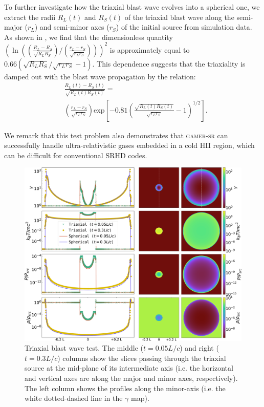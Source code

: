 To further investigate how the triaxial blast wave evolves into a spherical one, we extract the radii $R_{L}(t)$ and $R_{S}(t)$ of the triaxial blast wave along the semi-major ($r_{L}$) and semi-minor axes ($r_{S}$) of the initial source from simulation data. As shown in , we find that the dimensionless quantity $\left(\ln \left(\left(\frac{R_{L}-R_{S}}{\sqrt{R_{L}R_{S}}}\right)/ \left(\frac{r_{L}-r_{S}}{\sqrt{r_{L}r_{S}}}\right)\right)\right)^{2}$ is approximately equal to $0.66\left(\sqrt{R_{L}R_{S}}/\sqrt{r_{L}r_{S}}-1\right)$. This dependence suggests that the triaxiality is damped out with the blast wave propagation by the relation:
\begin{equation}
\begin{aligned}
          &\frac{R_{L}(t)-R_{S}(t)}{\sqrt{R_{L}(t)R_{S}(t)}} =\\ &\left(\frac{r_{L}-r_{S}}{\sqrt{r_{L}r_{S}}}\right)\text{exp}\left[-0.81\left(\frac{\sqrt{R_{L}(t)R_{S}(t)}}{\sqrt{r_{L}r_{S}}}-1\right)^{1/2}\right].
\end{aligned}
\label{eq:FittingBlast}
\end{equation}

We remark that this test problem also demonstrates that \textsc{gamer-sr} can successfully handle ultra-relativistic gases embedded in a cold HII region, which can be difficult for conventional SRHD codes.

\begin{figure}
\includegraphics[width=\linewidth]{srhd-figures/ProfileSliceLowRes.png}
\centering
\caption{Triaxial blast wave test. The middle ($t=0.05L/c$) and right ($t=0.3L/c$) columns show the slices passing through the triaxial source at the mid-plane of its intermediate axis (i.e. the horizontal and vertical axes are along the major and minor axes, respectively). The left column shows the profiles along the minor-axis (i.e. the white dotted-dashed line in the $\gamma$ map).}
\label{fig:Ellipsoid blast wave}
\end{figure}

